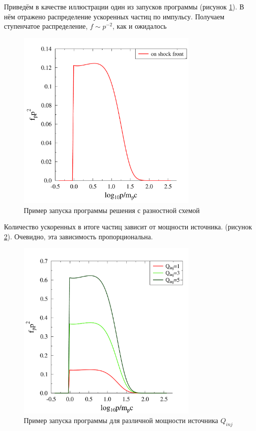 \documentclass[a4paper,14pt]{extarticle} %
\begin{document}
Приведём в качестве иллюстрации один из запусков программы (рисунок \ref{res/razn/common}). В нём отражено распределение ускоренных частиц по импульсу. Получаем ступенчатое распределение, $f\sim p^{-2}$, как и ожидалось
\begin{figure}[H]
\centering
\includegraphics[width=250pt]{r_common}
\caption{Пример запуска программы решения с разностной схемой}
\label{res/razn/common}
\end{figure}

Количество ускоренных в итоге частиц зависит от мощности источника. (рисунок \ref{res/razn/Qinj}). Очевидно, эта зависимость пропорциональна.
\begin{figure}[H]
\centering
\includegraphics[width=250pt]{r_Qinj}
\caption{Пример запуска программы для различной мощности источника $Q_{inj}$}
\label{res/razn/Qinj}
\end{figure}
\end{document}
